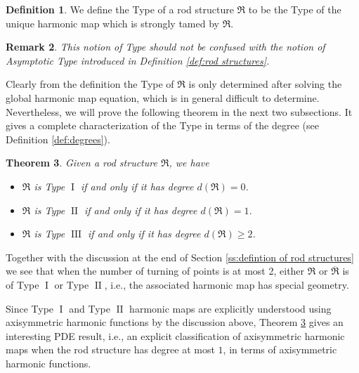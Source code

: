 \documentclass[a4paper,11pt]{amsart}
\newtheorem{theorem}{Theorem}[section]
\newtheorem{remark}[theorem]{Remark}
\theoremstyle{definition}
\newtheorem{definition}[theorem]{Definition}
\numberwithin{equation}{section}
\newcommand{\mR} {\mathfrak R}
\DeclareMathOperator{\I}{I}
\DeclareMathOperator{\II}{II}
\DeclareMathOperator{\III}{III}
\begin{document}
\begin{definition}
    We define the Type of a rod structure $\mR$ to be the Type of the unique harmonic map which is strongly tamed by $\mR$.
\end{definition}
\begin{remark}This notion of \emph{Type} should not be confused with the notion of \emph{Asymptotic Type} introduced in Definition \ref{def:rod structures}.
\end{remark}Clearly from the definition the Type of $\mR$
 is only determined after solving the global harmonic map equation, which is in general difficult to determine. Nevertheless, we will prove the following  theorem in the next two subsections. It gives a complete characterization of the Type in terms of the degree (see Definition \ref{def:degrees}).
\begin{theorem}\label{thm:equivalence of degree and type}
Given a rod structure $\mR$, we have
    \begin{itemize}
        \item $\mR$ is Type $\I$ if and only if it has degree $d(\mathfrak{R})=0$.
        \item $\mR$ is Type $\II$ if and only if it has degree $d(\mathfrak{R})=1$. 
         \item $\mR$ is Type $\III$ if and only if it has degree $d(\mathfrak{R})\geq 2$.
    \end{itemize}
\end{theorem}
Together with the discussion at the end of Section \ref{ss:defintion of rod structures} we see that when the number of turning of points is at most 2, either $\mR$ or $\overline {\mR}$ is of Type $\I$ or Type $\II$, i.e., the associated harmonic map has special geometry.

Since Type $\I$ and Type $\II$ harmonic maps are explicitly understood using axisymmetric harmonic functions by the discussion above, Theorem \ref{thm:equivalence of degree and type} gives an interesting PDE result, i.e., an explicit classification of axisymmetric harmonic maps when the rod structure has degree at most $1$, in terms of axisymmetric harmonic functions.
\end{document}
